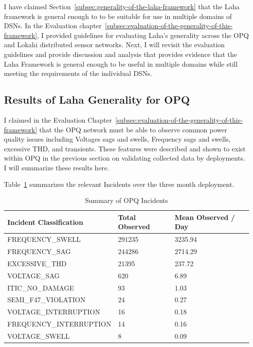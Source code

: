 I have claimed Section~\ref{subsec:generality-of-the-laha-framework} that the Laha framework is general enough to to be suitable for use in multiple domains of DSNs. In the Evaluation chapter~\ref{subsec:evaluation-of-the-generality-of-this-framework}, I provided guidelines for evaluating Laha's generality across the OPQ and Lokahi distributed sensor networks. Next, I will revisit the evaluation guidelines and provide discussion and analysis that provides evidence that the Laha Framework is general enough to be useful in multiple domains while still meeting the requirements of the individual DSNs.

\subsection{Results of Laha Generality for OPQ}\label{subsec:results-of-laha-generality-for-opq}

I claimed in the Evaluation Chapter~\ref{subsec:evaluation-of-the-generality-of-this-framework} that the OPQ network must be able to observe common power quality issues including Voltages sags and swells, Frequency sags and swells, excessive THD, and transients. These features were described and shown to exist within OPQ in the previous section on validating collected data by deployments. I will summarize these results here.

Table~\ref{table:incidents_summary} summarizes the relevant Incidents over the three month deployment.

\begin{table}[H]
    \centering
    \caption{Summary of OPQ Incidents}
    \begin{tabularx}{\textwidth}{Xll}
        \toprule
        \textbf{Incident Classification} & \textbf{Total Observed} & \textbf{Mean Observed / Day} \\
        \midrule
        FREQUENCY\_SWELL & 291235 & 3235.94 \\
        FREQUENCY\_SAG & 244286 & 2714.29 \\
        EXCESSIVE\_THD & 21395 & 237.72 \\
        VOLTAGE\_SAG & 620 & 6.89 \\
        ITIC\_NO\_DAMAGE & 93 & 1.03 \\
        SEMI\_F47\_VIOLATION & 24 & 0.27 \\
        VOLTAGE\_INTERRUPTION & 16 & 0.18 \\
        FREQUENCY\_INTERRUPTION & 14 & 0.16 \\
        VOLTAGE\_SWELL & 8 & 0.09 \\
        \bottomrule
    \end{tabularx}
    \label{table:incidents_summary}
\end{table}

